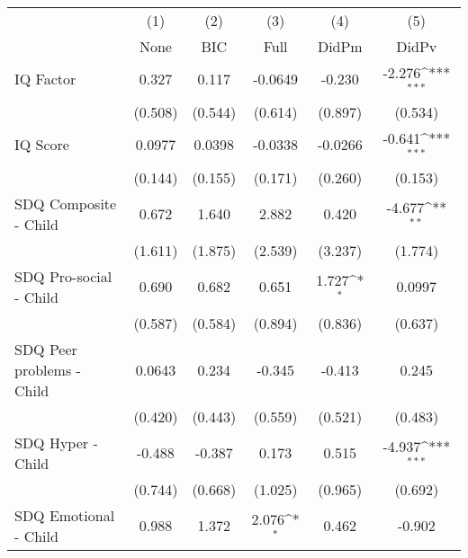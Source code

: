 {
\def\sym#1{\ifmmode^{#1}\else\(^{#1}\)\fi}
\begin{tabular}{l*{5}{c}}
\toprule
            &\multicolumn{1}{c}{(1)}&\multicolumn{1}{c}{(2)}&\multicolumn{1}{c}{(3)}&\multicolumn{1}{c}{(4)}&\multicolumn{1}{c}{(5)}\\
            &\multicolumn{1}{c}{None}&\multicolumn{1}{c}{BIC}&\multicolumn{1}{c}{Full}&\multicolumn{1}{c}{DidPm}&\multicolumn{1}{c}{DidPv}\\
\midrule
IQ Factor   &       0.327         &       0.117         &     -0.0649         &      -0.230         &      -2.276\sym{***}\\
            &     (0.508)         &     (0.544)         &     (0.614)         &     (0.897)         &     (0.534)         \\
\addlinespace
IQ Score    &      0.0977         &      0.0398         &     -0.0338         &     -0.0266         &      -0.641\sym{***}\\
            &     (0.144)         &     (0.155)         &     (0.171)         &     (0.260)         &     (0.153)         \\
\addlinespace
SDQ Composite - Child&       0.672         &       1.640         &       2.882         &       0.420         &      -4.677\sym{**} \\
            &     (1.611)         &     (1.875)         &     (2.539)         &     (3.237)         &     (1.774)         \\
\addlinespace
SDQ Pro-social - Child&       0.690         &       0.682         &       0.651         &       1.727\sym{*}  &      0.0997         \\
            &     (0.587)         &     (0.584)         &     (0.894)         &     (0.836)         &     (0.637)         \\
\addlinespace
SDQ Peer problems - Child&      0.0643         &       0.234         &      -0.345         &      -0.413         &       0.245         \\
            &     (0.420)         &     (0.443)         &     (0.559)         &     (0.521)         &     (0.483)         \\
\addlinespace
SDQ Hyper - Child&      -0.488         &      -0.387         &       0.173         &       0.515         &      -4.937\sym{***}\\
            &     (0.744)         &     (0.668)         &     (1.025)         &     (0.965)         &     (0.692)         \\
\addlinespace
SDQ Emotional - Child&       0.988         &       1.372         &       2.076\sym{*}  &       0.462         &      -0.902         \\

\end{tabular}}

